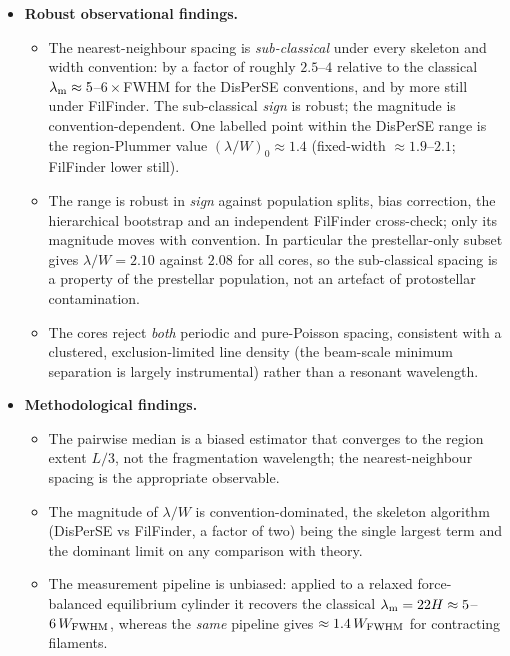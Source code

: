 \documentclass[usenatbib,twoside,twocolumn]{mnras}
\begin{document}
\begin{itemize}
    \item \textbf{Robust observational findings.}
    \begin{itemize}
        \item The nearest-neighbour spacing is \emph{sub-classical} under every skeleton and width convention: by a factor of roughly $2.5$--$4$ relative to the classical $\lambda_{\rm m}\approx5$--$6\times$FWHM for the DisPerSE conventions, and by more still under FilFinder. The sub-classical \emph{sign} is robust; the magnitude is convention-dependent. One labelled point within the DisPerSE range is the region-Plummer value $(\lambda/W)_0\approx1.4$ (fixed-width $\approx1.9$--$2.1$; FilFinder lower still).
        \item The range is robust in \emph{sign} against population splits, bias correction, the hierarchical bootstrap and an independent FilFinder cross-check; only its magnitude moves with convention. In particular the prestellar-only subset gives $\lambda/W=2.10$ against $2.08$ for all cores, so the sub-classical spacing is a property of the prestellar population, not an artefact of protostellar contamination.
        \item The cores reject \emph{both} periodic and pure-Poisson spacing, consistent with a clustered, exclusion-limited line density (the beam-scale minimum separation is largely instrumental) rather than a resonant wavelength.
    \end{itemize}

    \item \textbf{Methodological findings.}
    \begin{itemize}
        \item The pairwise median is a biased estimator that converges to the region extent $L/3$, not the fragmentation wavelength; the nearest-neighbour spacing is the appropriate observable.
        \item The magnitude of $\lambda/W$ is convention-dominated, the skeleton algorithm (DisPerSE vs FilFinder, a factor of two) being the single largest term and the dominant limit on any comparison with theory.
        \item The measurement pipeline is unbiased: applied to a relaxed force-balanced equilibrium cylinder it recovers the classical $\lambda_{\rm m}=22H\approx5$--$6\,W_{\rm FWHM}$, whereas the \emph{same} pipeline gives $\approx1.4\,W_{\rm FWHM}$ for contracting filaments.
    \end{itemize}


\end{itemize}
\end{document}
